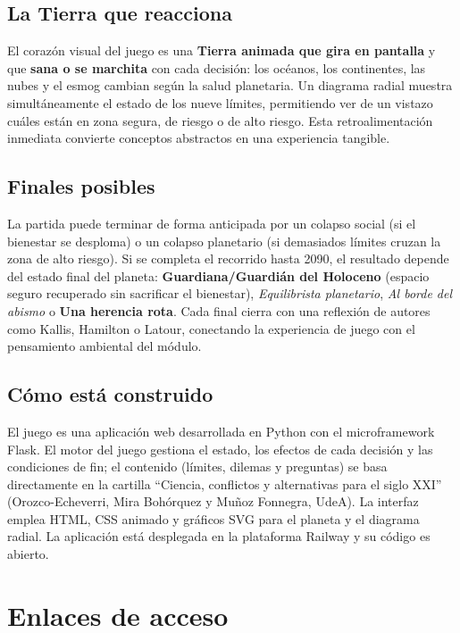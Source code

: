 \documentclass[12pt,a4paper]{article}
\newcommand{\zona}[2]{\textcolor{#1}{\textbf{#2}}}
\begin{document}
\subsection*{La Tierra que reacciona}

El coraz\'{o}n visual del juego es una \textbf{Tierra animada que gira en pantalla} y que \textbf{sana o se marchita} con cada decisi\'{o}n: los oc\'{e}anos, los continentes, las nubes y el esmog cambian seg\'{u}n la salud planetaria. Un diagrama radial muestra simult\'{a}neamente el estado de los nueve l\'{i}mites, permitiendo ver de un vistazo cu\'{a}les est\'{a}n en zona segura, de riesgo o de alto riesgo. Esta retroalimentaci\'{o}n inmediata convierte conceptos abstractos en una experiencia tangible.

\subsection*{Finales posibles}

La partida puede terminar de forma anticipada por un colapso social (si el bienestar se desploma) o un colapso planetario (si demasiados l\'{i}mites cruzan la zona de alto riesgo). Si se completa el recorrido hasta 2090, el resultado depende del estado final del planeta: \zona{segura}{Guardiana/Guardi\'{a}n del Holoceno} (espacio seguro recuperado sin sacrificar el bienestar), \emph{Equilibrista planetario}, \emph{Al borde del abismo} o \zona{alto}{Una herencia rota}. Cada final cierra con una reflexi\'{o}n de autores como Kallis, Hamilton o Latour, conectando la experiencia de juego con el pensamiento ambiental del m\'{o}dulo.

\subsection*{C\'{o}mo est\'{a} construido}

El juego es una aplicaci\'{o}n web desarrollada en Python con el microframework Flask. El motor del juego gestiona el estado, los efectos de cada decisi\'{o}n y las condiciones de fin; el contenido (l\'{i}mites, dilemas y preguntas) se basa directamente en la cartilla ``Ciencia, conflictos y alternativas para el siglo XXI'' (Orozco-Echeverri, Mira Boh\'{o}rquez y Mu\~{n}oz Fonnegra, UdeA). La interfaz emplea HTML, CSS animado y gr\'{a}ficos SVG para el planeta y el diagrama radial. La aplicaci\'{o}n est\'{a} desplegada en la plataforma Railway y su c\'{o}digo es abierto.

\section*{Enlaces de acceso}
\end{document}
